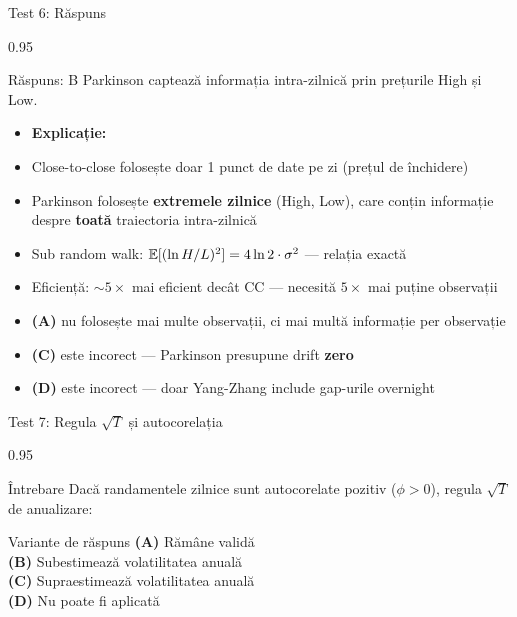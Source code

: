 \documentclass[9pt, aspectratio=169, t]{beamer}
\begin{document}
\begin{frame}[shrink=10]{Test 6: Răspuns}
\begin{cminipage}{0.95\textwidth}
    \begin{exampleblock}{Răspuns: B}
        Parkinson captează informația intra-zilnică prin prețurile High și Low.
    \end{exampleblock}
    \vspace{0.2cm}
    \begin{itemize}\setlength{\itemsep}{0pt}
        \item \textbf{Explicație:}
        \item Close-to-close folosește doar 1 punct de date pe zi (prețul de închidere)
        \item Parkinson folosește \textbf{extremele zilnice} (High, Low), care conțin informație despre \textbf{toată} traiectoria intra-zilnică
        \item Sub random walk: $\mathbb{E}[(\ln H/L)^2] = 4\ln 2 \cdot \sigma^2$ --- relația exactă
        \item Eficiență: $\sim 5\times$ mai eficient decât CC --- necesită $5\times$ mai puține observații
        \item \textbf{(A)} nu folosește mai multe observații, ci mai multă informație per observație
        \item \textbf{(C)} este incorect --- Parkinson presupune drift \textbf{zero}
        \item \textbf{(D)} este incorect --- doar Yang-Zhang include gap-urile overnight
    \end{itemize}
\end{cminipage}
\end{frame}

\begin{frame}[shrink=10]{Test 7: Regula $\sqrt{T}$ și autocorelația}
\begin{cminipage}{0.95\textwidth}
    \begin{alertblock}{Întrebare}
        Dacă randamentele zilnice sunt autocorelate pozitiv ($\phi > 0$), regula $\sqrt{T}$ de anualizare:
    \end{alertblock}

    \vspace{0.5cm}
    \begin{block}{Variante de răspuns}
    \textcolor{MainBlue}{\textbf{(A)}} Rămâne validă\\[3pt]
    \textcolor{MainBlue}{\textbf{(B)}} Subestimează volatilitatea anuală\\[3pt]
    \textcolor{MainBlue}{\textbf{(C)}} Supraestimează volatilitatea anuală\\[3pt]
    \textcolor{MainBlue}{\textbf{(D)}} Nu poate fi aplicată
    \end{block}
\end{cminipage}
\end{frame}
\end{document}
